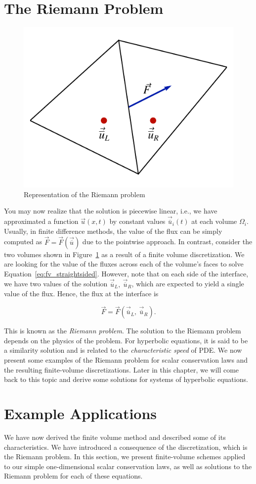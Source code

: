 \section{The Riemann Problem}
\begin{figure}[htbp]
 \centering
 \includegraphics[width=0.4\linewidth]{Pictures/ch11_fv_riemann_diagram}
 \caption{Representation of the Riemann problem}
 \label{fig:fv_riemannproblem}
\end{figure}
You may now realize that the solution is piecewise linear, i.e., we have approximated a function $\vec u(x,t)$ by constant values $\vec {\overline u}_i(t)$ at each volume $\Omega_i$. Usually, in finite difference methods, the value of the flux can be simply computed as $\vec{F}=\vec{F}(\vec{\overline{u}})$ due to the pointwise approach. In contrast, consider the two volumes shown in Figure~\ref{fig:fv_riemannproblem} as a result of a finite volume discretization. We are looking for the value of the fluxes across each of the volume's faces to solve Equation~\ref{eq:fv_straightsided}. However, note that on each side of the interface, we have two values of the solution $\vec{\overline{u}}_L,~\vec{\overline{u}}_R$, which are expected to yield a single value of the flux. Hence, the flux at the interface is
\begin{eqBox}
 \begin{equation}
 \vec{F} = \vec{F} (\vec{\overline{u}}_L,~\vec{\overline{u}}_R).
 \end{equation}
\end{eqBox}
This is known as the \textit{Riemann problem}. The solution to the Riemann problem depends on the physics of the problem. For hyperbolic equations, it is said to be a similarity solution and is related to the \textit{characteristic speed} of PDE. We now present some examples of the Riemann problem for scalar conservation laws and the resulting finite-volume discretizations. Later in this chapter, we will come back to this topic and derive some solutions for systems of hyperbolic equations.

\section{Example Applications}
We have now derived the finite volume method and described some of its characteristics. We have introduced a consequence of the discretization, which is the Riemann problem. In this section, we present finite-volume schemes applied to our simple one-dimensional scalar conservation laws, as well as solutions to the Riemann problem for each of these equations.
